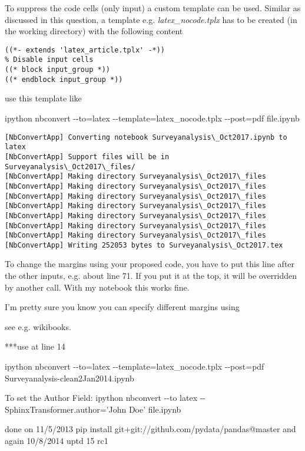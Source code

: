 \documentclass[11pt]{article}
\begin{document}
    To suppress the code cells (only input) a custom template can be used.
Similar as discussed in this question, a template e.g.
\emph{latex\_nocode.tplx} has to be created (in the working directory)
with the following content

\begin{verbatim}
((*- extends 'latex_article.tplx' -*))
% Disable input cells
((* block input_group *))
((* endblock input_group *))
\end{verbatim}

use this template like

ipython nbconvert -\/-to=latex -\/-template=latex\_nocode.tplx
-\/-post=pdf file.ipynb


    \begin{Verbatim}[commandchars=\\\{\}]
[NbConvertApp] Converting notebook Surveyanalysis\_Oct2017.ipynb to latex
[NbConvertApp] Support files will be in Surveyanalysis\_Oct2017\_files/
[NbConvertApp] Making directory Surveyanalysis\_Oct2017\_files
[NbConvertApp] Making directory Surveyanalysis\_Oct2017\_files
[NbConvertApp] Making directory Surveyanalysis\_Oct2017\_files
[NbConvertApp] Making directory Surveyanalysis\_Oct2017\_files
[NbConvertApp] Making directory Surveyanalysis\_Oct2017\_files
[NbConvertApp] Making directory Surveyanalysis\_Oct2017\_files
[NbConvertApp] Making directory Surveyanalysis\_Oct2017\_files
[NbConvertApp] Writing 252053 bytes to Surveyanalysis\_Oct2017.tex

    \end{Verbatim}









    To change the margins using your proposed code, you have to put this
line after the other inputs, e.g. about line 71. If you put it at the
top, it will be overridden by another call. With my notebook this works
fine.

I'm pretty sure you know you can specify different margins using
\usepackage[left=0.5in, right=0.5in, top=0.5in, bottom=0.5in]{geometry}
see e.g. wikibooks.

***use at line 14
\usepackage[left=0.75in, right=0.75in, top=0.75in, bottom=0.5in]{geometry}

ipython nbconvert -\/-to=latex -\/-template=latex\_nocode.tplx
-\/-post=pdf Surveyanalysis-clean2Jan2014.ipynb

To set the Author Field: ipython nbconvert -\/-to latex
-\/-SphinxTransformer.author='John Doe' file.ipynb


























    done on 11/5/2013 pip install git+git://github.com/pydata/pandas@master
and again 10/8/2014 uptd 15 rc1








\fi

    
    
    
    
\end{document}
